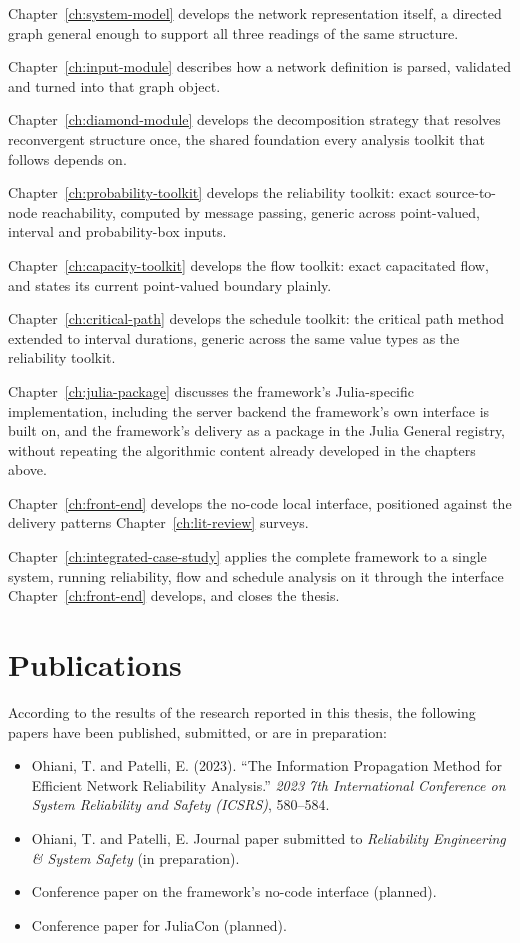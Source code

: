 \documentclass[12pt]{report}
\begin{document}
Chapter~\ref{ch:system-model} develops the network representation itself, a directed graph general
enough to support all three readings of the same structure.

Chapter~\ref{ch:input-module} describes how a network definition is parsed, validated and turned
into that graph object.

Chapter~\ref{ch:diamond-module} develops the decomposition strategy that resolves reconvergent
structure once, the shared foundation every analysis toolkit that follows depends on.

Chapter~\ref{ch:probability-toolkit} develops the reliability toolkit: exact source-to-node
reachability, computed by message passing, generic across point-valued, interval and
probability-box inputs.

Chapter~\ref{ch:capacity-toolkit} develops the flow toolkit: exact capacitated flow, and states its
current point-valued boundary plainly.

Chapter~\ref{ch:critical-path} develops the schedule toolkit: the critical path method extended to
interval durations, generic across the same value types as the reliability toolkit.

Chapter~\ref{ch:julia-package} discusses the framework's Julia-specific implementation, including
the server backend the framework's own interface is built on, and the framework's delivery as a
package in the Julia General registry, without repeating the algorithmic content already developed
in the chapters above.

Chapter~\ref{ch:front-end} develops the no-code local interface, positioned against the delivery
patterns Chapter~\ref{ch:lit-review} surveys.

Chapter~\ref{ch:integrated-case-study} applies the complete framework to a single system, running
reliability, flow and schedule analysis on it through the interface Chapter~\ref{ch:front-end}
develops, and closes the thesis.

\section{Publications}
\label{sec:intro-publications}

According to the results of the research reported in this thesis, the following papers have been
published, submitted, or are in preparation:

\begin{itemize}
  \item Ohiani, T. and Patelli, E. (2023). ``The Information Propagation Method for Efficient
    Network Reliability Analysis.'' \textit{2023 7th International Conference on System
    Reliability and Safety (ICSRS)}, 580--584.
  \item Ohiani, T. and Patelli, E. Journal paper submitted to \textit{Reliability Engineering
    \& System Safety} (in preparation).
  \item Conference paper on the framework's no-code interface (planned).
  \item Conference paper for JuliaCon (planned).
\end{itemize}
\end{document}
